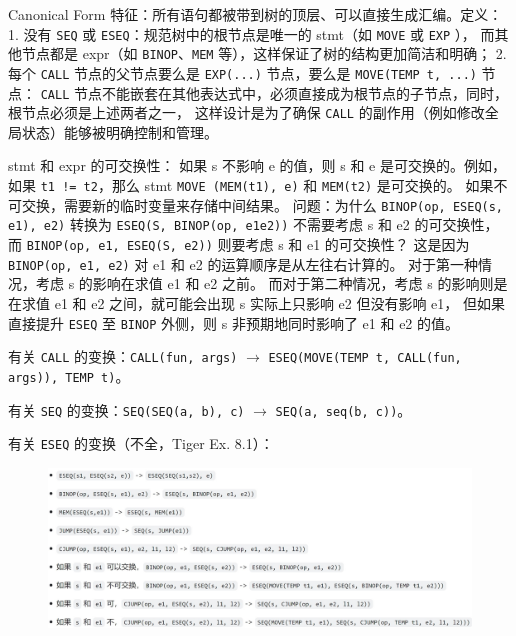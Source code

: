 \par \noindent Canonical Form 特征：所有语句都被带到树的顶层、可以直接生成汇编。定义：
1. 没有 \texttt{SEQ} 或 \texttt{ESEQ}：规范树中的根节点是唯一的 stmt（如 \texttt{MOVE} 或 \texttt{EXP} ），
而其他节点都是 expr（如 \texttt{BINOP}、\texttt{MEM} 等），这样保证了树的结构更加简洁和明确；
2. 每个 \texttt{CALL} 节点的父节点要么是 \texttt{EXP(...)} 节点，要么是 \texttt{MOVE(TEMP t, ...)} 节点：
\texttt{CALL} 节点不能嵌套在其他表达式中，必须直接成为根节点的子节点，同时，根节点必须是上述两者之一，
这样设计是为了确保 \texttt{CALL} 的副作用（例如修改全局状态）能够被明确控制和管理。

\par \noindent stmt 和 expr 的可交换性：
如果 s 不影响 e 的值，则 s 和 e 是可交换的。例如，如果 \texttt{t1 != t2}，那么 stmt \texttt{MOVE (MEM(t1), e)} 和 \texttt{MEM(t2)} 是可交换的。
如果不可交换，需要新的临时变量来存储中间结果。
问题：为什么 \texttt{BINOP(op, ESEQ(s, e1), e2)} 转换为 \texttt{ESEQ(S, BINOP(op, e1e2))} 不需要考虑 s 和 e2 的可交换性，
而 \texttt{BINOP(op, e1, ESEQ(S, e2))} 则要考虑 s 和 e1 的可交换性？
这是因为 \texttt{BINOP(op, e1, e2)} 对 e1 和 e2 的运算顺序是从左往右计算的。
对于第一种情况，考虑 s 的影响在求值 e1 和 e2 之前。
而对于第二种情况，考虑 s 的影响则是在求值 e1 和 e2 之间，就可能会出现 s 实际上只影响 e2 但没有影响 e1，
但如果直接提升 \texttt{ESEQ} 至 \texttt{BINOP} 外侧，则 s 非预期地同时影响了 e1 和 e2 的值。

\par \noindent 有关 \texttt{CALL} 的变换：\texttt{CALL(fun, args)} $\rightarrow$ \texttt{ESEQ(MOVE(TEMP t, CALL(fun, args)), TEMP t)}。

\par \noindent 有关 \texttt{SEQ} 的变换：\texttt{SEQ(SEQ(a, b), c)} $\rightarrow$ \texttt{SEQ(a, seq(b, c))}。

\par \noindent 有关 \texttt{ESEQ} 的变换（不全，Tiger Ex. 8.1）：

\begin{figure}[H]
    \centering
    \includegraphics[width=\linewidth]{figures/irc1.png}
\end{figure}

